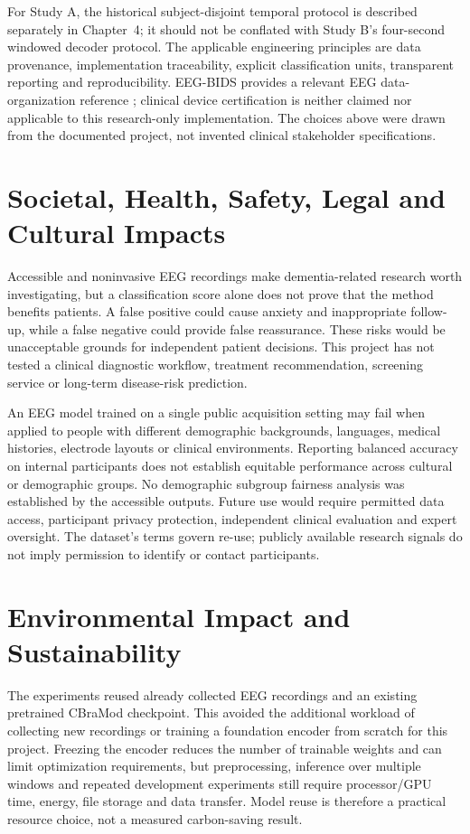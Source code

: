 For Study A, the historical subject-disjoint temporal protocol is described separately in Chapter~4; it should not be conflated with Study B's four-second windowed decoder protocol. The applicable engineering principles are data provenance, implementation traceability, explicit classification units, transparent reporting and reproducibility. EEG-BIDS provides a relevant EEG data-organization reference \cite{pernet2019}; clinical device certification is neither claimed nor applicable to this research-only implementation. The choices above were drawn from the documented project, not invented clinical stakeholder specifications.

\section{Societal, Health, Safety, Legal and Cultural Impacts}
Accessible and noninvasive EEG recordings make dementia-related research worth investigating, but a classification score alone does not prove that the method benefits patients. A false positive could cause anxiety and inappropriate follow-up, while a false negative could provide false reassurance. These risks would be unacceptable grounds for independent patient decisions. This project has not tested a clinical diagnostic workflow, treatment recommendation, screening service or long-term disease-risk prediction.

An EEG model trained on a single public acquisition setting may fail when applied to people with different demographic backgrounds, languages, medical histories, electrode layouts or clinical environments. Reporting balanced accuracy on internal participants does not establish equitable performance across cultural or demographic groups. No demographic subgroup fairness analysis was established by the accessible outputs. Future use would require permitted data access, participant privacy protection, independent clinical evaluation and expert oversight. The dataset's terms govern re-use; publicly available research signals do not imply permission to identify or contact participants.

\section{Environmental Impact and Sustainability}
The experiments reused already collected EEG recordings and an existing pretrained CBraMod checkpoint. This avoided the additional workload of collecting new recordings or training a foundation encoder from scratch for this project. Freezing the encoder reduces the number of trainable weights and can limit optimization requirements, but preprocessing, inference over multiple windows and repeated development experiments still require processor/GPU time, energy, file storage and data transfer. Model reuse is therefore a practical resource choice, not a measured carbon-saving result.

